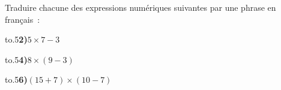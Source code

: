 \documentclass[exercice]{thedocument}%
\begin{document}
%
Traduire chacune des expressions numériques suivantes par une phrase en français~:\par\vskip10pt
\hbox{\hbox to.5\hbox{{\bfseries 2)}\hskip5pt$5\times7-3$\hfill}}\par\vskip10pt
\hbox{\hbox to.5\hbox{{\bfseries 4)}\hskip5pt$8\times(9-3)$\hfill}}\par\vskip10pt
\hbox{\hbox to.5\hbox{{\bfseries 6)}\hskip5pt$(15+7)\times(10-7)$\hfill}}
\end{document}
